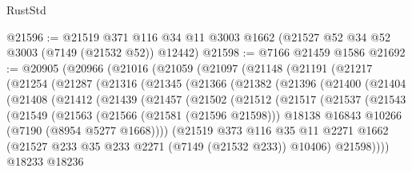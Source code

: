 \begin{lexlean}{RustStd}
\begin{coremodule}
@21596 := @21519
    @371
    @116
    @34
    @11
    @3003
    @1662
    (@21527 @52 @34 @52 @3003 (@7149 (@21532 @52)) @12442)
@21598 := @7166 @21459 @1586
@21692 := @20905
    (@20966
      (@21016
        (@21059
          (@21097
            (@21148
              (@21191
                (@21217
                  (@21254
                    (@21287
                      (@21316
                        (@21345
                          (@21366
                            (@21382
                              (@21396
                                (@21400
                                  (@21404
                                    (@21408
                                      (@21412
                                        (@21439
                                          (@21457
                                            (@21502
                                              (@21512
                                                (@21517
                                                  (@21537
                                                    (@21543
                                                      (@21549
                                                        (@21563
                                                          (@21566 (@21581 (@21596 @21598)))
                                                          @18138
                                                          @16843
                                                          @10266
                                                          (@7190 (@8954 @5277 @1668))))
                                                      (@21519
                                                        @373
                                                        @116
                                                        @35
                                                        @11
                                                        @2271
                                                        @1662
                                                        (@21527
                                                          @233
                                                          @35
                                                          @233
                                                          @2271
                                                          (@7149 (@21532 @233))
                                                          @10406)
                                                        @21598))))
                                                @18233
                                                @18236

\end{coremodule}
\end{lexlean}
